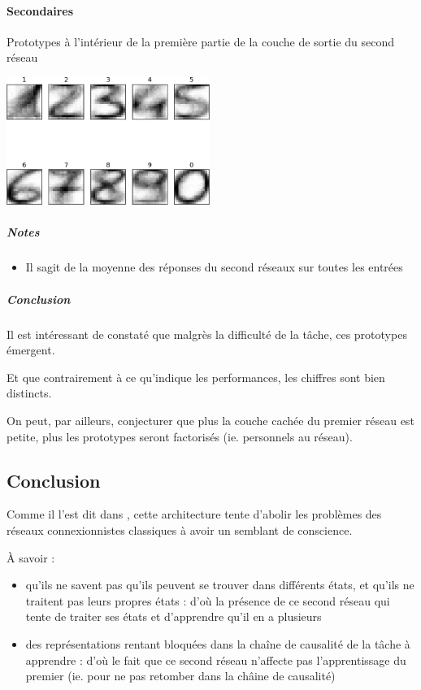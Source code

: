     \paragraph{Secondaires}
      Prototypes à l'intérieur de la première partie de la couche de sortie du second réseau
      \begin{center}
	\includegraphics[width=250px]{data/expA3/prototype.png}
      \end{center} 
      \subparagraph{Notes}
	\begin{itemize}
	  \item Il sagit de la moyenne des réponses du second réseaux sur toutes les entrées
	\end{itemize}
      \subparagraph{Conclusion}
	Il est intéressant de constaté que malgrès la difficulté de la tâche, ces prototypes émergent.
	
	Et que contrairement à ce qu'indique les performances, les chiffres sont bien distincts.
      
	On peut, par ailleurs, conjecturer que plus la couche cachée du premier réseau est petite, plus les prototypes 
	seront factorisés (ie. personnels au réseau).
	


  \subsection{Conclusion}
    Comme il l'est dit dans \cite{Cleeremans_2007}, cette architecture tente d'abolir les problèmes des réseaux connexionnistes
  classiques à avoir un semblant de conscience.
  
  À savoir :
  \begin{itemize}
   \item qu'ils ne savent pas qu'ils peuvent se trouver dans différents états, et qu'ils ne traitent pas leurs propres états : 
   d'où la présence de ce second réseau qui tente de traiter ses états et d'apprendre qu'il en a plusieurs
   \item des représentations rentant bloquées dans la chaîne de causalité de la tâche à apprendre : d'où
   le fait que ce second réseau n'affecte pas l'apprentissage du premier (ie. pour ne pas retomber dans la châine de causalité)
   \\[0.2cm]
  \end{itemize}
  
